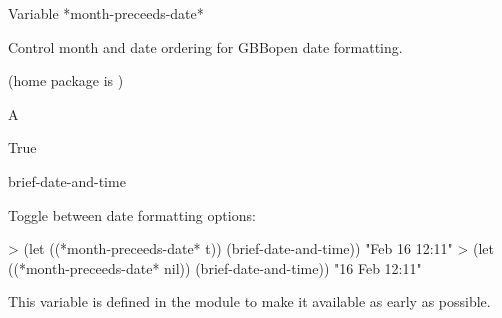 \documentclass[10pt,twoside,english,pdftex]{article}
\begin{document}

\begin{functiondoc}{Variable}%
{*month-preceeds-date*}{}%

\fnsyntax

\fnpurpose Control month and date ordering for GBBopen date formatting.

\fnpackage {} (home package is )

\fnmodule {}

\fnvaluetype A 

\fninitialvalue True

\begin{alsos}{brief-date-and-time}
\end{alsos}

\fnexamples
Toggle between date formatting options:
\begin{example}
> (let ((*month-preceeds-date* t))
    (brief-date-and-time))
"Feb 16 12:11"
> (let ((*month-preceeds-date* nil))
    (brief-date-and-time))
"16 Feb 12:11"
\end{example}

\fnnote
{}%
%
This variable is defined in the  module to make it
available as early as possible.

\end{functiondoc}

\end{document}
